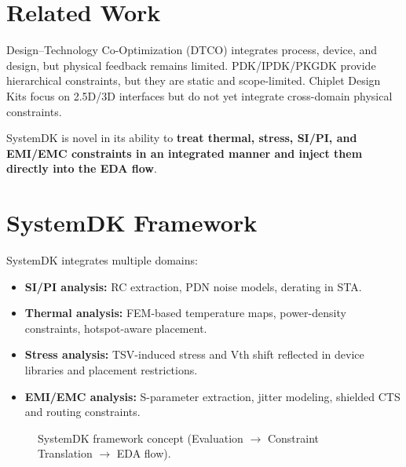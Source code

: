 \documentclass[conference]{IEEEtran}
\begin{document}
\section{Related Work}
Design--Technology Co-Optimization (DTCO) integrates process, device, and design, but physical feedback remains limited.
PDK/IPDK/PKGDK provide hierarchical constraints, but they are static and scope-limited.
Chiplet Design Kits focus on 2.5D/3D interfaces but do not yet integrate cross-domain physical constraints.

SystemDK is novel in its ability to \textbf{treat thermal, stress, SI/PI, and EMI/EMC constraints in an integrated manner and inject them directly into the EDA flow}.

\section{SystemDK Framework}
SystemDK integrates multiple domains:
\begin{itemize}
  \item \textbf{SI/PI analysis:} RC extraction, PDN noise models, derating in STA.
  \item \textbf{Thermal analysis:} FEM-based temperature maps, power-density constraints, hotspot-aware placement.
  \item \textbf{Stress analysis:} TSV-induced stress and Vth shift reflected in device libraries and placement restrictions.
  \item \textbf{EMI/EMC analysis:} S-parameter extraction, jitter modeling, shielded CTS and routing constraints.
\end{itemize}

\begin{figure}[htbp]
  \centering
  \caption{SystemDK framework concept (Evaluation $\rightarrow$ Constraint Translation $\rightarrow$ EDA flow).}
  \label{fig:framework}
\end{figure}
\end{document}
